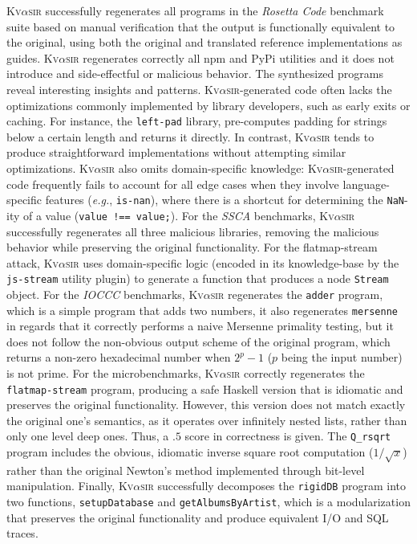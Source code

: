 \documentclass[nonacm,sigplan,review]{acmart}
\def\eg{{\em e.g.}, }
\newcommand{\sys}{{\scshape Kv{$\alpha$}sir}\xspace}
\newcommand{\ttt}[1]{\texttt{#1}\xspace}
\begin{document}
\sys successfully regenerates all programs in the \textit{Rosetta Code} benchmark suite
based on manual verification that the output is functionally equivalent
to the original, using both the original and translated reference implementations as guides.
\sys regenerates correctly all npm and PyPi utilities and it does not introduce and side-effectful or malicious behavior.
The synthesized programs reveal interesting insights and patterns.
\sys-generated code often lacks the optimizations commonly
implemented by library developers, such as early exits or caching.
For instance, the \ttt{left-pad} library, pre-computes padding for strings below a certain length
and returns it directly.
In contrast, \sys tends to produce straightforward
implementations without attempting similar optimizations.
\sys also omits domain-specific knowledge:
\sys-generated code frequently fails to account for all edge cases when they involve language-specific features (\eg \ttt{is-nan}), where there is a shortcut for determining 
the \ttt{NaN}-ity of a value (\ttt{value !== value;}).
For the \textit{SSCA} benchmarks, \sys successfully regenerates all three malicious libraries, removing the malicious behavior while preserving the original functionality.
For the flatmap-stream attack, \sys uses domain-specific logic (encoded in its knowledge-base by the \ttt{js-stream} utility plugin) to generate a function that produces a node \ttt{Stream} object.
For the \textit{IOCCC} benchmarks, \sys regenerates the \ttt{adder} program, which is a simple program that adds two numbers,
it also regenerates \ttt{mersenne} in regards that it correctly performs a naive Mersenne primality testing, but it does not follow the non-obvious output scheme of the original program, which returns a non-zero hexadecimal number when $2^p - 1$ ($p$ being the input number) is not prime.
For the microbenchmarks, \sys correctly regenerates the \ttt{flatmap-stream} program, producing a safe Haskell version that is idiomatic and preserves the original functionality.
However, this version does not match exactly the original one's semantics, as it operates over infinitely nested lists, rather than only one level deep ones.
Thus, a $.5$ score in correctness is given.
The \ttt{Q\_rsqrt} program includes the obvious, idiomatic inverse square root computation ($1/\sqrt{x}$) rather than the original Newton's method implemented through bit-level manipulation.
Finally, \sys successfully decomposes the \ttt{rigidDB} program into two
functions, \ttt{setupDatabase} and \ttt{getAlbumsByArtist}, which is a
modularization that preserves the original functionality and produce equivalent I/O and SQL traces.
\end{document}
